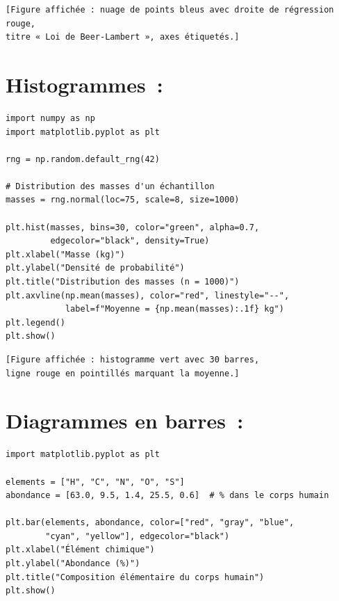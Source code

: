 \begin{codeoutput}
\begin{verbatim}
[Figure affichée : nuage de points bleus avec droite de régression rouge,
titre « Loi de Beer-Lambert », axes étiquetés.]
\end{verbatim}
\end{codeoutput}

\section{Histogrammes~: }

\begin{codeblock}[title=\textbf{Python}]
\begin{verbatim}
import numpy as np
import matplotlib.pyplot as plt

rng = np.random.default_rng(42)

# Distribution des masses d'un échantillon
masses = rng.normal(loc=75, scale=8, size=1000)

plt.hist(masses, bins=30, color="green", alpha=0.7,
         edgecolor="black", density=True)
plt.xlabel("Masse (kg)")
plt.ylabel("Densité de probabilité")
plt.title("Distribution des masses (n = 1000)")
plt.axvline(np.mean(masses), color="red", linestyle="--",
            label=f"Moyenne = {np.mean(masses):.1f} kg")
plt.legend()
plt.show()
\end{verbatim}
\end{codeblock}

\begin{codeoutput}
\begin{verbatim}
[Figure affichée : histogramme vert avec 30 barres,
ligne rouge en pointillés marquant la moyenne.]
\end{verbatim}
\end{codeoutput}

\section{Diagrammes en barres~: }

\begin{codeblock}[title=\textbf{Python}]
\begin{verbatim}
import matplotlib.pyplot as plt

elements = ["H", "C", "N", "O", "S"]
abondance = [63.0, 9.5, 1.4, 25.5, 0.6]  # % dans le corps humain

plt.bar(elements, abondance, color=["red", "gray", "blue",
        "cyan", "yellow"], edgecolor="black")
plt.xlabel("Élément chimique")
plt.ylabel("Abondance (%)")
plt.title("Composition élémentaire du corps humain")
plt.show()
\end{verbatim}
\end{codeblock}


